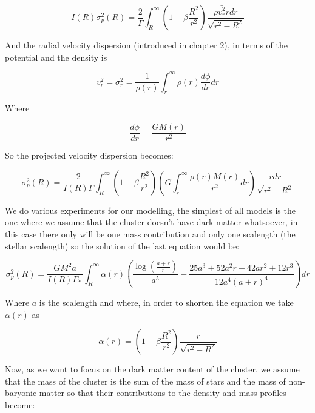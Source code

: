 \begin{equation}
I(R)\sigma_{p}^{2}(R)=\frac{2}{\Gamma}\int_{R}^{\infty}\left(1-\beta\frac{R^{2}}{r^{2}}\right)\frac{\rho\bar{v_{r}^{2}}rdr}{\sqrt{r^{2}-R^{2}}}
\end{equation}

And the radial velocity dispersion (introduced in chapter 2), in terms of the potential and the density is

\begin{equation}
\bar{v_{r}^{2}}=\sigma_{r}^{2}=\frac{1}{\rho(r)}\int_{r}^{\infty}\rho(r)\frac{d\phi}{dr}dr
\end{equation}

Where 

\begin{equation}
\frac{d\phi}{dr}=\frac{GM(r)}{r^{2}}
\end{equation}

So the projected velocity dispersion becomes:

\begin{equation}
\sigma_{p}^{2}(R)=\frac{2}{I(R)\Gamma}\int_{R}^{\infty}\left(1-\beta\frac{R^{2}}{r^{2}}\right)\left(G\int_{r}^{\infty}\frac{\rho(r)M(r)}{r^{2}}dr\right)\frac{rdr}{\sqrt{r^{2}-R^{2}}}
\end{equation}

We do various experiments for our modelling, the simplest of all models is the one where we assume that the cluster doesn't have dark matter whatsoever, in this case there only will be one mass contribution and only one scalength (the stellar scalength) so the solution of the last equation would be:

\begin{equation}
\sigma_{p}^{2}(R)=\frac{GM^{2}a}{I(R)\Gamma\pi}\int_{R}^{\infty}\alpha(r)\left(\frac{\log{\left(\frac{a+r}{r}\right)}}{a^{5}}-\frac{25a^{3}+52a^{2}r+42ar^{2}+12r^{3}}{12a^{4}\left(a+r\right)^{4}}\right)dr
\end{equation}

Where $a$ is the scalength and where, in order to shorten the equation we take $\alpha(r)$ as 

\begin{equation}
\alpha(r)=\left(1-\beta\frac{R^{2}}{r^{2}}\right)\frac{r}{\sqrt{r^{2}-R^{2}}}
\end{equation}

Now, as we want to focus on the dark matter content of the cluster, we assume that the mass of the cluster is the sum of the mass of stars and the mass of non-baryonic matter so that their contributions to the density and mass profiles become:

